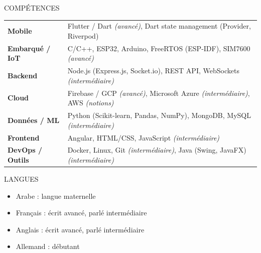 \documentclass{resume}
\begin{document}
\begin{rSection}{COMPÉTENCES}

\begin{tabular}{ @{} >{\bfseries}l @{\hspace{2ex}} l }
Mobile         & Flutter / Dart \textit{(avancé)}, Dart state management (Provider, Riverpod) \\
Embarqué / IoT & C/C++, ESP32, Arduino, FreeRTOS (ESP-IDF), SIM7600 \textit{(avancé)} \\
Backend        & Node.js (Express.js, Socket.io), REST API, WebSockets \textit{(intermédiaire)} \\
Cloud          & Firebase / GCP \textit{(avancé)}, Microsoft Azure \textit{(intermédiaire)}, AWS \textit{(notions)} \\
Données / ML   & Python (Scikit-learn, Pandas, NumPy), MongoDB, MySQL \textit{(intermédiaire)} \\
Frontend       & Angular, HTML/CSS, JavaScript \textit{(intermédiaire)} \\
DevOps / Outils& Docker, Linux, Git \textit{(intermédiaire)}, Java (Swing, JavaFX) \textit{(intermédiaire)} \\
\end{tabular}

\end{rSection}

\begin{rSection}{LANGUES}

\begin{itemize}
    \item Arabe : langue maternelle
    \item Français : écrit avancé, parlé intermédiaire
    \item Anglais : écrit avancé, parlé intermédiaire
    \item Allemand : débutant
\end{itemize}

\end{rSection}
\end{document}
